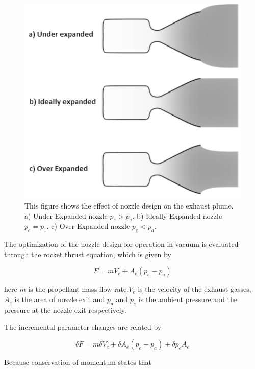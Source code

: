 \begin{figure}
\begin{center}
\includegraphics[scale=0.8]{figures/navtheory/nozzle}
\caption{This figure shows the effect of nozzle design on the exhaust plume. a) Under Expanded nozzle $p_e>p_a$. b) Ideally Expanded nozzle $p_e=p_1$. c) Over Expanded nozzle $p_e<p_a$. }
\label{jetflows}
\end{center}
\end{figure}

The optimization of the nozzle design for operation in vacuum is evaluated through the rocket thrust equation, which is given by \cite{spacecraft}

\begin{equation}
F=mV_e+A_e(p_e-p_a)
\end{equation}

here $m$ is the propellant mass flow rate,$V_e$ is the velocity of the exhaust gasses, $A_e$ is the area of nozzle exit and $p_a$ and $p_e$ is the ambient pressure and the pressure at the nozzle exit respectively. 

The incremental parameter changes are related by

\begin{equation}
\delta F=m\delta V_e +\delta A_e(p_e-p_a) +\delta p_e A_e
\end{equation}

Because conservation of momentum states that 

